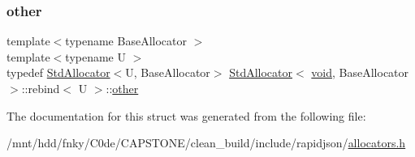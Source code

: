 \subsubsection{\texorpdfstring{other}{other}}
{\footnotesize\ttfamily template$<$typename Base\+Allocator $>$ \\
template$<$typename U $>$ \\
typedef \hyperlink{classStdAllocator}{Std\+Allocator}$<$U, Base\+Allocator$>$ \hyperlink{classStdAllocator}{Std\+Allocator}$<$ \hyperlink{imgui__impl__opengl3__loader_8h_ac668e7cffd9e2e9cfee428b9b2f34fa7}{void}, Base\+Allocator $>$\+::rebind$<$ U $>$\+::\hyperlink{structStdAllocator_3_01void_00_01BaseAllocator_01_4_1_1rebind_a05d001c4a784dd30027c19392de10f8e}{other}}



The documentation for this struct was generated from the following file\+:\begin{DoxyCompactItemize}
\item 
/mnt/hdd/fnky/\+C0de/\+C\+A\+P\+S\+T\+O\+N\+E/clean\+\_\+build/include/rapidjson/\hyperlink{allocators_8h}{allocators.\+h}\end{DoxyCompactItemize}
